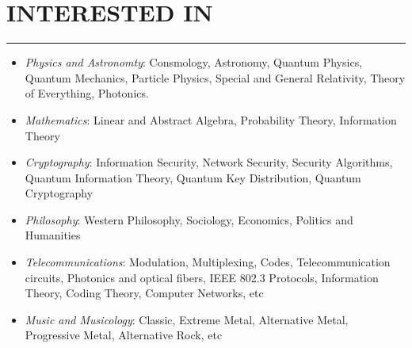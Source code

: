 \documentclass[10pt,a4paper]{article}
\begin{document}
\section{INTERESTED IN}
\noindent \rule {3.2cm}{0.4pt}
  \begin{itemize}
    \setlength{\rightskip}{2cm}
    \setlength\itemsep{0em}
    \item \small \textit{Physics and Astronomty}: Consmology, Astronomy, Quantum Physics, Quantum Mechanics, Particle Physics, Special and General Relativity, Theory of Everything, Photonics.
    \item \small \textit{Mathematics}: Linear and Abstract Algebra, Probability Theory, Information Theory
    \item \small \textit{Cryptography}: Information Security, Network Security, Security Algorithms, Quantum Information Theory, Quantum Key Distribution, Quantum Cryptography
    \item \small \textit{Philosophy}: Western Philosophy, Sociology, Economics, Politics and Humanities
    \item \small \textit{Telecommunications}: Modulation, Multiplexing, Codes, Telecommunication circuits, Photonics and optical fibers, IEEE 802.3 Protocols, Information Theory, Coding Theory, Computer Networks, etc
    \item \small \textit{Music and Musicology}: Classic, Extreme Metal, Alternative Metal, Progressive Metal, Alternative Rock, etc
  \end{itemize}
\end{document}
